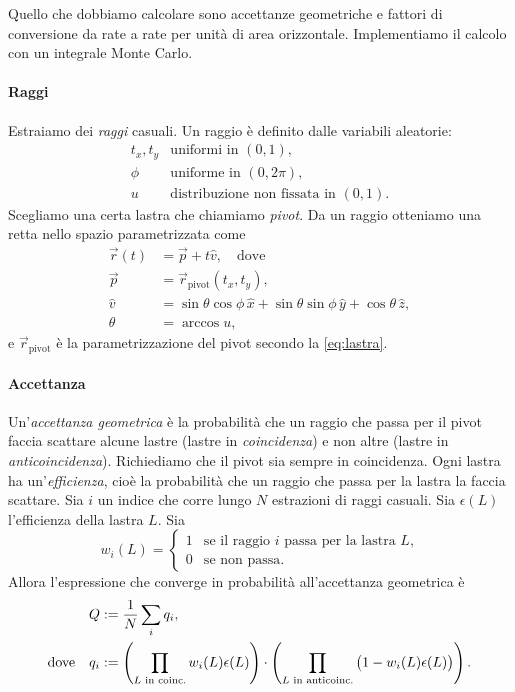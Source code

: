Quello che dobbiamo calcolare sono accettanze geometriche
e fattori di conversione da rate a rate per unità di area orizzontale.
Implementiamo il calcolo con un integrale Monte Carlo.

\paragraph{Raggi}

Estraiamo dei \emph{raggi} casuali.
Un raggio è definito dalle variabili aleatorie:
\begin{equation*}
	\begin{array}{ll}
		t_x, t_y & \text{uniformi in $(0,1)$}, \\
		\phi     & \text{uniforme in $(0,2\pi)$}, \\
		u        & \text{distribuzione non fissata in $(0,1)$}.
	\end{array}
\end{equation*}
Scegliamo una certa lastra che chiamiamo \emph{pivot}.
Da un raggio otteniamo una retta nello spazio parametrizzata come
\begin{align*}
	\vec r(t) &= \vec p + t \hat v, \quad \text{dove} \\
	\vec p    &= \vec r_\text{pivot}(t_x, t_y), \\
	\hat v    &= \sin\theta\cos\phi\,\hat x + \sin\theta\sin\phi\,\hat y + \cos\theta\,\hat z, \\
	\theta    &= \arccos u,
\end{align*}
e $\vec r_\text{pivot}$ è la parametrizzazione del pivot secondo la \eqref{eq:lastra}.

\paragraph{Accettanza}

Un'\emph{accettanza geometrica} è la probabilità
che un raggio che passa per il pivot
faccia scattare alcune lastre (lastre in \emph{coincidenza})
e non altre (lastre in \emph{anticoincidenza}).
Richiediamo che il pivot sia sempre in coincidenza.
Ogni lastra ha un'\emph{efficienza},
cioè la probabilità che un raggio che passa per la lastra la faccia scattare.
Sia $i$ un indice che corre lungo $N$ estrazioni di raggi casuali.
Sia $\epsilon(L)$ l'efficienza della lastra $L$.
Sia
\begin{equation*}
	w_i(L) = \begin{cases}
		1 & \text{se il raggio $i$ passa per la lastra $L$,} \\
		0 & \text{se non passa.}
	\end{cases}
\end{equation*}
Allora l'espressione che converge in probabilità all'accettanza geometrica è
\begin{align}
	\label{eq:accettanza}
	Q &:= \frac1N \sum_i q_i, \\
	\text{dove}\quad q_i &:= 
	\left( \prod_\text{$L$ in coinc.} w_i(L) \epsilon(L) \right)
	\cdot \left( \prod_\text{$L$ in anticoinc.} \big(1 - w_i(L) \epsilon(L)\big) \right). \notag
\end{align}


